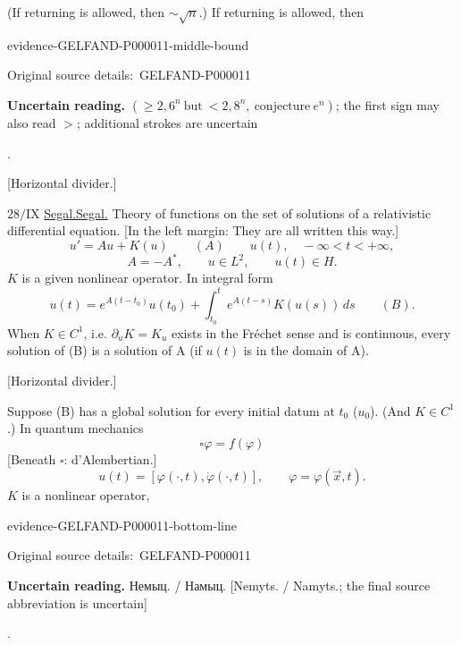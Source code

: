 \documentclass[11pt]{article}
\let\MathUnderline\underline
\renewcommand{\underline}[1]{\ifmmode\MathUnderline{#1}\else\uline{#1}\fi}
\newcommand{\EvidenceBlock}[4]{%
 \par\smallskip\noindent\begin{minipage}{\linewidth}
 \begin{minipage}[t]{.47\linewidth}\vspace{0pt}\centering
 \csname evidence-#1-#2\endcsname\par
 {\scriptsize\SourceCropCaption\ #1}\par
 \end{minipage}\hfill
 \begin{minipage}[t]{.49\linewidth}\vspace{0pt}\raggedright
 {\small\color{orange!65!black}\textbf{#4} #3}\par
 \end{minipage}
 \end{minipage}\par\smallskip}
\newcommand{\Unclear}[3]{\EvidenceBlock{#1}{#2}{#3}{\ReadingCaption}}
\newcommand{\SourceCropCaption}{Original source details:}\newcommand{\ReadingCaption}{Uncertain reading.}\newcommand{\IncompleteCaption}{Undeciphered passage.}\newcommand{\DiagramCaption}{Diagram and typed description.}
\begin{document}
(If returning is allowed, then $\sim\sqrt n$.)
If returning is allowed, then
\Unclear{GELFAND-P000011}{middle-bound}{$(\geq2{,}6^n\ \text{but}\ <2{,}8^n,\ \text{conjecture}\ e^n)$; the first sign may also read $>$; additional strokes are uncertain}.

[Horizontal divider.]

$28/\mathrm{IX}$ \underline{Segal.}
Theory of functions on the set of solutions of a relativistic differential equation.
[In the left margin: They are all written this way.]
\begin{equation*}
u'=Au+K(u)\qquad(A)\qquad u(t),\quad -\infty<t<+\infty,
\end{equation*}
\begin{equation*}
A=-A^*,\qquad u\in L^2,\qquad u(t)\in H.
\end{equation*}
$K$ is a given nonlinear operator.
In integral form
\begin{equation*}
u(t)=e^{A(t-t_0)}u(t_0)+\int_{t_0}^{t}e^{A(t-s)}K(u(s))\,ds\qquad(B).
\end{equation*}
When $K\in C^1$, i.e. $\partial_uK=K_u$ exists in the Fréchet sense and is continuous, every solution of (B) is a solution of A (if $u(t)$ is in the domain of A).

[Horizontal divider.]

Suppose (B) has a global solution for every initial datum at $t_0$ ($u_0$).
(And $K\in C^1$.)
In quantum mechanics
\begin{equation*}
\square\varphi=f(\varphi)
\end{equation*}
[Beneath $\square$: d'Alembertian.]
\begin{equation*}
u(t)=[\varphi(\cdot,t),\dot\varphi(\cdot,t)],\qquad
\varphi=\varphi(\vec x,t).
\end{equation*}
$K$ is a nonlinear operator, \Unclear{GELFAND-P000011}{bottom-line}{Немыц. / Намыц. [Nemyts. / Namyts.; the final source abbreviation is uncertain]}.
\end{document}
